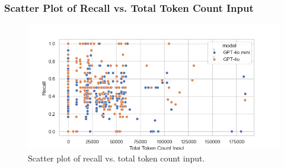             \subsubsection{Scatter Plot of Recall vs. Total Token Count Input}
            \begin{figure}[H]
                \centering
                \includegraphics[scale=0.75]{images_exp2/recall/scatter_recall_vs_total_token_count_input.png}
                \caption{Scatter plot of recall vs. total token count input.}
                \label{fig:scatter_recall_vs_total_token_count_input}
            \end{figure}






            



        